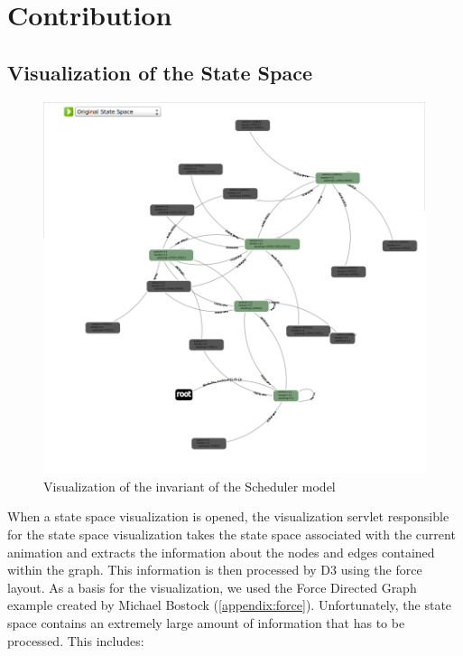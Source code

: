 \section{Contribution}

\subsection{Visualization of the State Space}

\begin{figure}[h!]
\centering
\includegraphics[width=15cm]{bilder/ss-zoomedOut.png}
\caption{Visualization of the invariant of the Scheduler model}
\label{zoomedOut}
\end{figure}

When a state space visualization is opened, the visualization servlet responsible for the state space visualization takes the state space associated with the current animation and extracts the information about the nodes and edges contained within the graph. This information is then processed by D3 using the force layout. As a basis for the visualization, we used the Force Directed Graph example created by Michael Bostock (\ref{appendix:force}). Unfortunately, the state space contains an extremely large amount of information that has to be processed. This includes:

